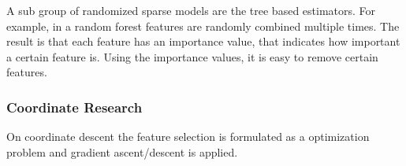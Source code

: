 A sub group of randomized sparse models are the tree based estimators. For example, in a random forest features are randomly combined multiple times. The result is that each feature has an importance value, that indicates how important a certain feature is. Using the importance values, it is easy to remove certain features.

\subsubsection{Coordinate Research}
On coordinate descent the feature selection is formulated as a optimization problem and gradient ascent/descent is applied.
